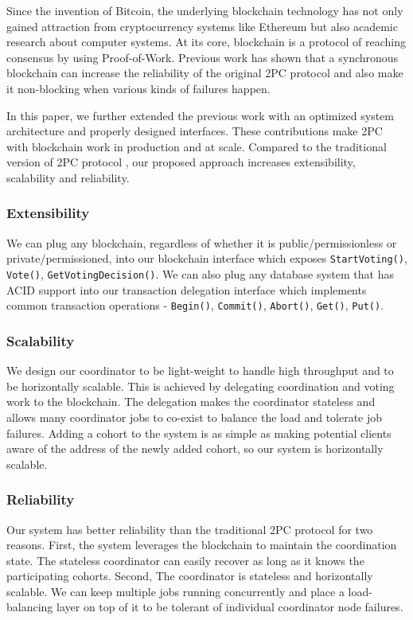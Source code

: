 \documentclass[11pt,sigplan,screen,nonacm]{acmart}
\begin{document}
Since the invention of Bitcoin, the underlying blockchain technology has not only gained attraction from  cryptocurrency systems like Ethereum \cite{wood2014ethereum} but also academic research about computer systems. At its core, blockchain  is a protocol of reaching consensus by using Proof-of-Work. Previous work \cite{ezhilchelvan2020non} has shown that a synchronous blockchain can increase the reliability of the original 2PC protocol and also make it non-blocking when various kinds of failures happen.

In this paper, we further extended the previous work with an optimized system architecture and properly designed interfaces. These contributions make 2PC with blockchain work in production and at scale. Compared to the traditional version of 2PC protocol \cite{lampson1993new}, our proposed approach increases extensibility, scalability and reliability.

\subsubsection{Extensibility}
We can plug any blockchain, regardless of whether it is public/permissionless or private/permissioned, into our blockchain interface which exposes \texttt{StartVoting()}, \texttt{Vote()}, \texttt{GetVotingDecision()}. We can also plug any database system that has ACID support into our transaction delegation interface which implements common transaction operations - \texttt{Begin()}, \texttt{Commit()}, \texttt{Abort()}, \texttt{Get()}, \texttt{Put()}.

\subsubsection{Scalability}
We design our coordinator to be light-weight to handle high throughput and to be horizontally scalable. This is achieved by delegating coordination and voting work to the blockchain. The delegation makes the coordinator stateless and allows many coordinator jobs to co-exist to balance the load and tolerate job failures. Adding a cohort to the system is as simple as making potential clients aware of the address of the newly added cohort, so our system is horizontally scalable.

\subsubsection{Reliability}
Our system has better reliability than the traditional 2PC protocol for two reasons. First, the system leverages the blockchain to maintain the coordination state. The stateless coordinator can easily recover as long as it knows the participating cohorts. Second, The coordinator is stateless and horizontally scalable. We can keep multiple jobs running concurrently and place a load-balancing layer on top of it to be tolerant of individual coordinator node failures.
\end{document}
